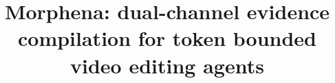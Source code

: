 \documentclass[conference]{IEEEtran}
\begin{document}
\title{Morphena: dual-channel evidence compilation for token bounded video editing agents\\
}


\maketitle
\end{document}
